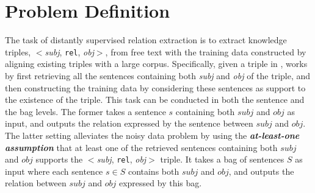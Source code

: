 \section{Problem Definition}
The task of distantly supervised relation extraction is to extract knowledge triples, $<$\emph{subj}, \texttt{rel}, \emph{obj}$>$, from free text with the training data constructed by aligning existing \KB triples with a large corpus.
Specifically, given a triple in \KB, \DS works by first retrieving all the sentences containing both \emph{subj} and \emph{obj} of the triple, and then constructing the training data by considering these sentences as support to the existence of the triple.
This task can be conducted in both the sentence and the bag levels.
The former  takes a sentence $s$ containing both $subj$ and $obj$ as input, and outputs the relation expressed
by the sentence between $subj$ and $obj$.
The latter setting
alleviates the noisy data problem by using the \textit{\textbf{at-least-one assumption}}
that at least one of the retrieved sentences containing both $subj$ and $obj$ supports the $<$\emph{subj}, \texttt{rel}, \emph{obj}$>$ triple.
It takes a bag of sentences $S$ as input where each sentence
$s\in S$ contains both $subj$ and
$obj$, and outputs  the relation between $subj$ and $obj$ expressed by this bag.


%
